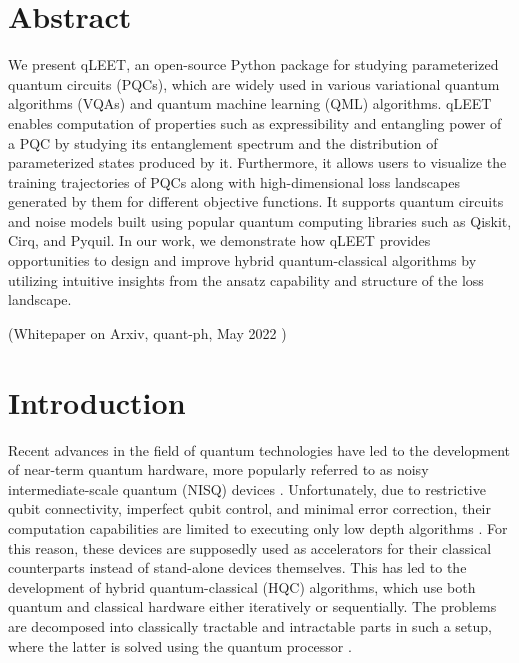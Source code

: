 \section{\label{qleet-sec:abstract}Abstract}

We present qLEET, an open-source Python package for studying parameterized quantum circuits (PQCs), which are widely used in various variational quantum algorithms (VQAs) and quantum machine learning (QML) algorithms. qLEET enables computation of properties such as expressibility and entangling power of a PQC by studying its entanglement spectrum and the distribution of parameterized states produced by it. Furthermore, it allows users to visualize the training trajectories of PQCs along with high-dimensional loss landscapes generated by them for different objective functions. It supports quantum circuits and noise models built using popular quantum computing libraries such as Qiskit, Cirq, and Pyquil. In our work, we demonstrate how qLEET provides opportunities to design and improve hybrid quantum-classical algorithms by utilizing intuitive insights from the ansatz capability and structure of the loss landscape.

{\smaller (Whitepaper on Arxiv, quant-ph, May 2022 \cite{self-qleet})}    

\section{\label{qleet-sec:intro}Introduction}

Recent advances in the field of quantum technologies have led to the development of near-term quantum hardware, more popularly referred to as noisy intermediate-scale quantum (NISQ) devices \cite{nisq_preskill, RevModPhys.94.015004}. Unfortunately, due to restrictive qubit connectivity, imperfect qubit control, and minimal error correction, their computation capabilities are limited to executing only low depth algorithms \cite{9251243}. For this reason, these devices are supposedly used as accelerators for their classical counterparts instead of stand-alone devices themselves. This has led to the development of hybrid quantum-classical (HQC) algorithms, which use both quantum and classical hardware either iteratively or sequentially. The problems are decomposed into classically tractable and intractable parts in such a setup, where the latter is solved using the quantum processor \cite{Endo2021-zy}. 

